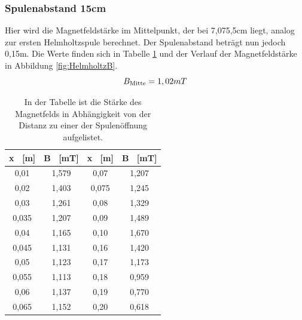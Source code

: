 \documentclass[titlepage = firstcover]{scrartcl}
\begin{document}
            \subsubsection{Spulenabstand 15cm}
            Hier wird die Magnetfeldstärke im Mittelpunkt, der bei 7,075,5cm liegt, analog zur ersten Helmholtzspule berechnet. Der Spulenabstand beträgt nun 
            jedoch 0,15m. Die Werte finden sich in Tabelle \ref{tab:HelmholtzB} und der Verlauf der Magnetfeldstärke in Abbildung \ref{fig:HelmholtzB}.
            \begin{equation}
                B_{\text{Mitte}} = 1,02mT \\
                \label{eqn:HelmB}
            \end{equation}
            \begin{table}[h]
                \centering 
                \caption{In der Tabelle ist die Stärke des Magnetfelds in Abhängigkeit von der Distanz zu einer der Spulenöffnung aufgelistet.}
                \label{tab:HelmholtzB}

                \begin{tabular}{c c c c}
                    \toprule
                    {x \ [m]} & {B \ [mT]} & {x \ [m]} & {B \ [mT]} \\
                    \midrule
                    0,01  & 1,579 & 0,07 & 1,207 \\
                    0,02  & 1,403 & 0,075 & 1,245 \\
                    0,03  & 1,261 & 0,08 & 1,329 \\
                    0,035 & 1,207 & 0,09 & 1,489 \\
                    0,04  & 1,165 & 0,10 & 1,670 \\
                    0,045 & 1,131 & 0,16 & 1,420 \\
                    0,05  & 1,123 & 0,17 & 1,173 \\
                    0,055 & 1,113 & 0,18 & 0,959 \\
                    0,06  & 1,137 & 0,19 & 0,770 \\
                    0,065 & 1,152 & 0,20 & 0,618 \\
                    \bottomrule
                \end{tabular}                
            \end{table}
\end{document}
